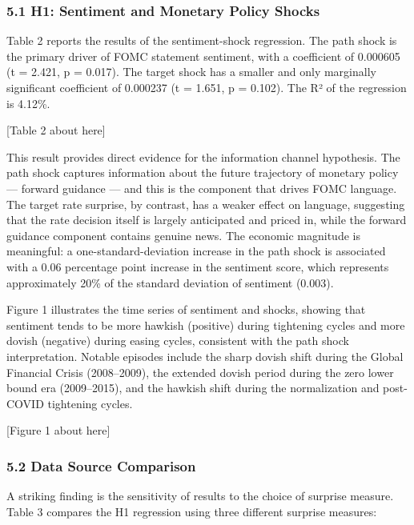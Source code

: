 \documentclass[
]{article}
\begin{document}
\subsubsection{5.1 H1: Sentiment and Monetary Policy
Shocks}\label{h1-sentiment-and-monetary-policy-shocks-1}

Table 2 reports the results of the sentiment-shock regression. The path
shock is the primary driver of FOMC statement sentiment, with a
coefficient of 0.000605 (t = 2.421, p = 0.017). The target shock has a
smaller and only marginally significant coefficient of 0.000237 (t =
1.651, p = 0.102). The R² of the regression is 4.12\%.

{[}Table 2 about here{]}

This result provides direct evidence for the information channel
hypothesis. The path shock captures information about the future
trajectory of monetary policy --- forward guidance --- and this is the
component that drives FOMC language. The target rate surprise, by
contrast, has a weaker effect on language, suggesting that the rate
decision itself is largely anticipated and priced in, while the forward
guidance component contains genuine news. The economic magnitude is
meaningful: a one-standard-deviation increase in the path shock is
associated with a 0.06 percentage point increase in the sentiment score,
which represents approximately 20\% of the standard deviation of
sentiment (0.003).

Figure 1 illustrates the time series of sentiment and shocks, showing
that sentiment tends to be more hawkish (positive) during tightening
cycles and more dovish (negative) during easing cycles, consistent with
the path shock interpretation. Notable episodes include the sharp dovish
shift during the Global Financial Crisis (2008--2009), the extended
dovish period during the zero lower bound era (2009--2015), and the
hawkish shift during the normalization and post-COVID tightening cycles.

{[}Figure 1 about here{]}

\subsubsection{5.2 Data Source Comparison}\label{data-source-comparison}

A striking finding is the sensitivity of results to the choice of
surprise measure. Table 3 compares the H1 regression using three
different surprise measures:
\end{document}
